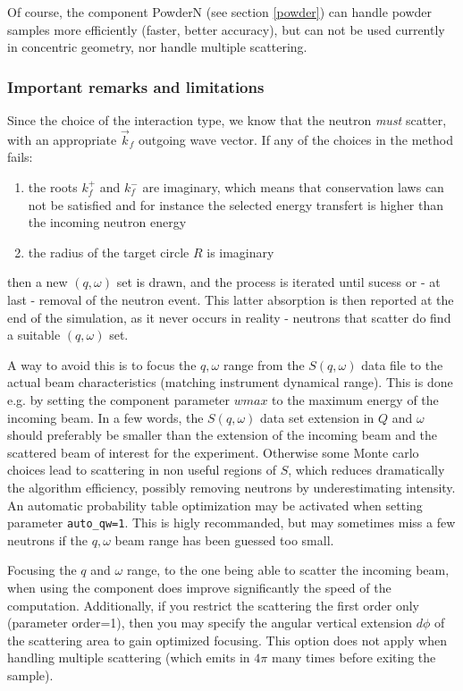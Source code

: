 Of course, the component PowderN (see section \ref{powder}) can handle powder samples more efficiently (faster, better accuracy), but can not be used currently in concentric geometry, nor handle multiple scattering.

\subsubsection{Important remarks and limitations}

Since the choice of the interaction type, we know that the neutron \emph{must} scatter, with an appropriate $\vec k_f$ outgoing wave vector. If any of the choices in the method fails:
\begin{enumerate}
\item the roots $k_f^+$ and $k_f^-$ are imaginary, which means that conservation laws can not be satisfied and for instance the selected energy transfert is higher than the incoming neutron energy
\item the radius of the target circle $R$ is imaginary
\end{enumerate}
then a new $(q, \omega)$ set is drawn, and the process is iterated until sucess or - at last - removal of the neutron event. This latter absorption is then reported at the end of the simulation, as it never occurs in reality - neutrons that scatter do find a suitable $(q, \omega)$ set.

A way to avoid this is to focus the $q,\omega$ range from the $S(q, \omega)$ data file to the actual beam characteristics (matching instrument dynamical range). This is done e.g. by setting the component parameter $wmax$ to the maximum energy of the incoming beam. In a few words, the $S(q,\omega)$ data set extension in $Q$ and $\omega$ should preferably be smaller than the extension of the incoming beam and the scattered beam of interest for the experiment. Otherwise some Monte carlo choices lead to scattering in non useful regions of $S$, which reduces dramatically the algorithm efficiency, possibly removing neutrons by underestimating intensity. An automatic probability table optimization may be activated when setting parameter \verb+auto_qw=1+. This is higly recommanded, but may sometimes miss a few neutrons if the $q,\omega$ beam range has been guessed too small.

Focusing the $q$ and $\omega$ range, to the one being able to scatter the incoming beam, when using the component does improve significantly the speed of the computation. Additionally, if you restrict the scattering the first order only (parameter order=1), then you may specify the angular vertical extension $d\phi$ of the scattering area to gain optimized focusing. This option does not apply when handling multiple scattering (which emits in $4\pi$ many times before exiting the sample).

